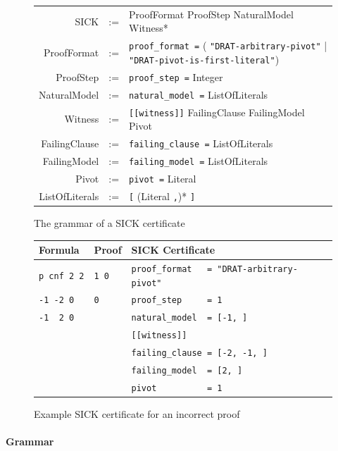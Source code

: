 \documentclass[
]{report}
\begin{document}
\begin{figure}
    \begin{tabular}{rcl}
    SICK            & := & ProofFormat ProofStep NaturalModel Witness* \\
    ProofFormat     & := & \texttt{proof\_format =}
    ( \texttt{"DRAT-arbitrary-pivot"} | \texttt{"DRAT-pivot-is-first-literal"}) \\
    ProofStep       & := & \texttt{proof\_step =} Integer \\
    NaturalModel    & := & \texttt{natural\_model =} ListOfLiterals \\
    Witness         & := & \texttt{[[witness]]} FailingClause FailingModel Pivot \\
    FailingClause   & := & \texttt{failing\_clause =} ListOfLiterals \\
    FailingModel    & := & \texttt{failing\_model =} ListOfLiterals \\
    Pivot           & := & \texttt{pivot =} Literal \\
    ListOfLiterals  & := & \texttt{[} (Literal \texttt{,})* \texttt{]} \\
    \end{tabular}
    \caption{The grammar of a SICK certificate\label{grammar}}
\end{figure}

\begin{figure}
    \begin{longtable}[]{@{}l|l|l@{}}
        Formula & Proof & SICK Certificate\tabularnewline
        \midrule
        \endhead
        \texttt{p\ cnf\ 2\ 2} & \texttt{1\ 0} &
        \texttt{proof\_format\ \ \ =\ "DRAT-arbitrary-pivot"}\tabularnewline
        \texttt{-1\ -2\ 0} & \texttt{0} &
        \texttt{proof\_step\ \ \ \ \ =\ 1}\tabularnewline
        \texttt{-1\ \ 2\ 0} & &
        \texttt{natural\_model\ \ =\ {[}-1,\ {]}}\tabularnewline
        & & \texttt{{[}{[}witness{]}{]}}\tabularnewline
        & & \texttt{failing\_clause\ =\ {[}-2,\ -1,\ {]}}\tabularnewline
        & & \texttt{failing\_model\ \ =\ {[}2,\ {]}}\tabularnewline
        & & \texttt{pivot\ \ \ \ \ \ \ \ \ \ =\ 1}\tabularnewline
    \end{longtable}
    \caption{Example SICK certificate for an incorrect proof\label{sick-example}}
\end{figure}


\paragraph{Grammar}
\end{document}
